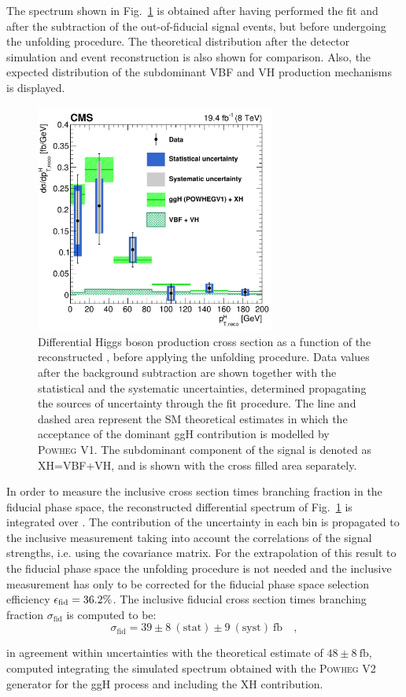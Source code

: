 The spectrum shown in Fig.~\ref{fig:pre_unfolding} is obtained after having performed the fit and after the subtraction of the out-of-fiducial signal events, but before undergoing the unfolding procedure. The theoretical distribution after the detector simulation and event reconstruction is also shown for comparison. Also, the expected distribution of the subdominant VBF and VH production mechanisms is displayed.

\begin{figure}[htb]
\centering
\includegraphics[width=0.7\textwidth]{images/unblinding/pth_reco_paper.pdf}
\caption{Differential Higgs boson production cross section as a function of the reconstructed \pth{}, before applying the unfolding procedure. Data values after the background subtraction are shown together with the statistical and the systematic uncertainties, determined propagating the sources of uncertainty through the fit procedure. The line and dashed area represent the SM theoretical estimates in which the acceptance of the dominant ggH contribution is modelled by \textsc{Powheg V1}. The subdominant component of the signal is denoted as XH=VBF+VH, and is shown with the cross filled area separately.}\label{fig:pre_unfolding}
\end{figure}

In order to measure the inclusive cross section times branching fraction in the fiducial phase space, the reconstructed differential spectrum of Fig.~\ref{fig:pre_unfolding} is integrated over \pth. The contribution of the uncertainty in each bin is propagated to the inclusive measurement taking into account the correlations of the signal strengths, i.e. using the covariance matrix. For the extrapolation of this result to the fiducial phase space the unfolding procedure is not needed and the inclusive measurement has only to be corrected for the fiducial phase space selection efficiency $\epsilon_{\rm{fid}} = 36.2\%$. The inclusive fiducial cross section times branching fraction $\sigma_{\mathrm{fid}}$ is computed to be:
\begin{equation}
\sigma_{\mathrm{fid}} = 39\pm 8~(\mathrm{stat}) \pm 9~(\mathrm{syst})~\mathrm{fb} \quad ,
\end{equation} 

\noindent in agreement within uncertainties with the theoretical estimate of $48 \pm 8 ~\mathrm{fb}$, computed integrating the simulated spectrum obtained with the \textsc{Powheg V2} generator for the ggH process and including the XH contribution.

